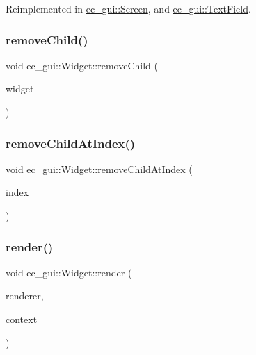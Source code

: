 Reimplemented in \mbox{\hyperlink{classec__gui_1_1_screen_a1becce24696b898cf30cd69815905f82}{ec\+\_\+gui\+::\+Screen}}, and \mbox{\hyperlink{classec__gui_1_1_text_field_afde8b13045264753e47a4e908240cab1}{ec\+\_\+gui\+::\+Text\+Field}}.

\mbox{\label{classec__gui_1_1_widget_a446a7ef5cb4b1bc35c75f909dbac4a06}} 
\subsubsection{\texorpdfstring{remove\+Child()}{removeChild()}}
{\footnotesize\ttfamily void ec\+\_\+gui\+::\+Widget\+::remove\+Child (\begin{DoxyParamCaption}\item[{\mbox{\hyperlink{classec__gui_1_1_widget}{Widget}} $\ast$}]{widget }\end{DoxyParamCaption})\hspace{0.3cm}{\ttfamily [virtual]}}

\mbox{\label{classec__gui_1_1_widget_a05ad16c193da23b6689671b5947fc84e}} 
\subsubsection{\texorpdfstring{remove\+Child\+At\+Index()}{removeChildAtIndex()}}
{\footnotesize\ttfamily void ec\+\_\+gui\+::\+Widget\+::remove\+Child\+At\+Index (\begin{DoxyParamCaption}\item[{unsigned int}]{index }\end{DoxyParamCaption})\hspace{0.3cm}{\ttfamily [virtual]}}

\mbox{\label{classec__gui_1_1_widget_ade9b99741eb922b24f8328509483f129}} 
\subsubsection{\texorpdfstring{render()}{render()}}
{\footnotesize\ttfamily void ec\+\_\+gui\+::\+Widget\+::render (\begin{DoxyParamCaption}\item[{\mbox{\hyperlink{classec__gui_1_1_gui_renderer}{Gui\+Renderer}} \&}]{renderer,  }\item[{\mbox{\hyperlink{classec__gui_1_1_gui_rendering_context}{Gui\+Rendering\+Context}} \&}]{context }\end{DoxyParamCaption})\hspace{0.3cm}{\ttfamily [virtual]}}



